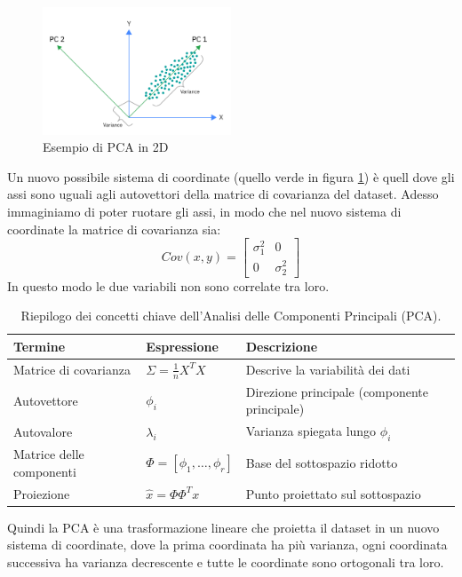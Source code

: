 \begin{figure}[H]
	\centering
	\includegraphics[width=0.5\textwidth]{pictures/pca.png}
	\caption{Esempio di PCA in 2D}
	\label{fig:pca}
\end{figure}
Un nuovo possibile sistema di coordinate (quello verde in figura \ref{fig:pca}) è quell dove gli assi sono uguali agli autovettori della matrice di covarianza del dataset.
Adesso immaginiamo di poter ruotare gli assi, in modo che nel nuovo sistema di coordinate la matrice di covarianza sia:
\[Cov(x,y)=\begin{bmatrix}
\sigma_1^2 & 0 \\
0 & \sigma_2^2
\end{bmatrix}\]
In questo modo le due variabili non sono correlate tra loro.
\begin{table}[H]
\centering

\begin{tabular}{lll}
\toprule
\textbf{Termine} & \textbf{Espressione} & \textbf{Descrizione} \\
\midrule
Matrice di covarianza & $\Sigma = \frac{1}{n} X^{T} X$ & Descrive la variabilità dei dati \\
Autovettore & $\phi_i$ & Direzione principale (componente principale) \\
Autovalore & $\lambda_i$ & Varianza spiegata lungo $\phi_i$ \\
Matrice delle componenti & $\Phi = [\phi_1, \ldots, \phi_r]$ & Base del sottospazio ridotto \\
Proiezione & $\hat{x} = \Phi \Phi^{T} x$ & Punto proiettato sul sottospazio \\
\bottomrule
\end{tabular}
\caption{Riepilogo dei concetti chiave dell'Analisi delle Componenti Principali (PCA).}
\end{table}
\noindent
Quindi la PCA è una trasformazione lineare che proietta il dataset in un nuovo sistema di coordinate, dove la prima coordinata ha più varianza,
ogni coordinata successiva ha varianza decrescente e tutte le coordinate sono ortogonali tra loro.
\\
